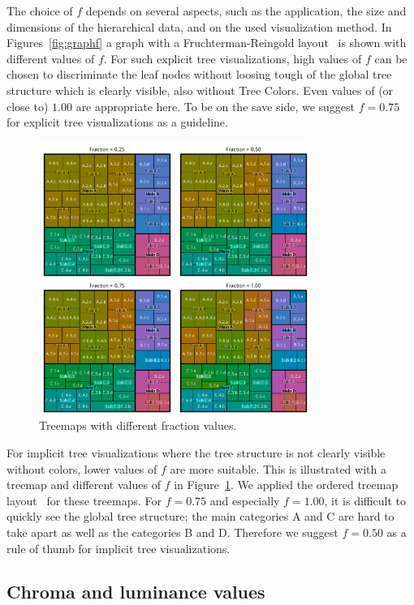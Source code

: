 \documentclass[journal]{vgtc}                %
\begin{document}
The choice of $f$ depends on several aspects, such as the application, the size and dimensions of the hierarchical data, and on the used visualization method. In Figures~\ref{fig:graphf} a graph with a Fruchterman-Reingold layout~\cite{Fruchterman91} is shown with different values of ${f}$. For such explicit tree visualizations, high values of ${f}$ can be chosen to discriminate the leaf nodes without loosing tough of the global tree structure which is clearly visible, also without Tree Colors. Even values of (or close to) $1.00$ are appropriate here. To be on the save side, we suggest $f=0.75$ for explicit tree visualizations as a guideline.

\begin{figure}[tb]
  \centering
  \includegraphics[width=3.5in]{Treemaps_hue.pdf}
  \caption{Treemaps with different fraction values.}\label{fig:treemapf}
\end{figure}


For implicit tree visualizations where the tree structure is not clearly visible without colors, lower values of $f$ are more suitable. This is illustrated with a treemap and different values of $f$ in Figure~\ref{fig:treemapf}. We applied the ordered treemap layout~\cite{Bederson2002} for these treemaps. For $f=0.75$ and especially $f=1.00$, it is difficult to quickly see the global tree structure; the main categories A and C are hard to take apart as well as the categories B and D. Therefore we suggest $f=0.50$ as a rule of thumb for implicit tree visualizations.

\subsection{Chroma and luminance values}
\end{document}
